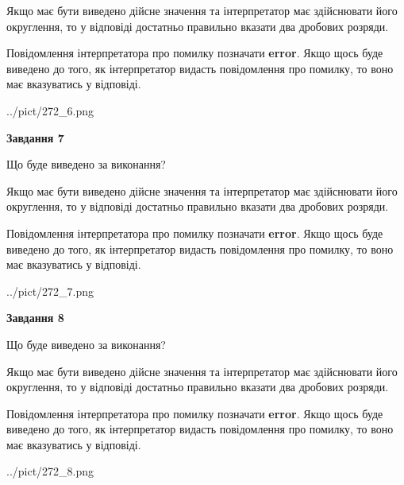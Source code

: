 \documentclass[12pt, ukrainian]{article}
\begin{document}
{\begin {Large}
Якщо має бути виведено дійсне значення та інтерпретатор має здійснювати його округлення, 
то у відповіді достатньо правильно вказати два дробових розряди.

Повідомлення інтерпретатора про помилку позначати \textbf{error}.
Якщо щось буде виведено до того, як інтерпретатор видасть повідомлення про помилку, 
то воно має вказуватись у відповіді. \par

\begin{center}
	{../pict/272_6.png}
\end{center}
\newpage

{\begin {center}\textbf{Завдання 7}\end {center}}\par
Що буде виведено за виконання? \par

Якщо має бути виведено дійсне значення та інтерпретатор має здійснювати його округлення, 
то у відповіді достатньо правильно вказати два дробових розряди.

Повідомлення інтерпретатора про помилку позначати \textbf{error}.
Якщо щось буде виведено до того, як інтерпретатор видасть повідомлення про помилку, 
то воно має вказуватись у відповіді. \par

\begin{center}
	{../pict/272_7.png}
\end{center}
\newpage

{\begin {center}\textbf{Завдання 8}\end {center}}\par
Що буде виведено за виконання? \par

Якщо має бути виведено дійсне значення та інтерпретатор має здійснювати його округлення, 
то у відповіді достатньо правильно вказати два дробових розряди.

Повідомлення інтерпретатора про помилку позначати \textbf{error}.
Якщо щось буде виведено до того, як інтерпретатор видасть повідомлення про помилку, 
то воно має вказуватись у відповіді. \par

\begin{center}
	{../pict/272_8.png}
\end{center}
\newpage


\end{Large}}
\end{document}
